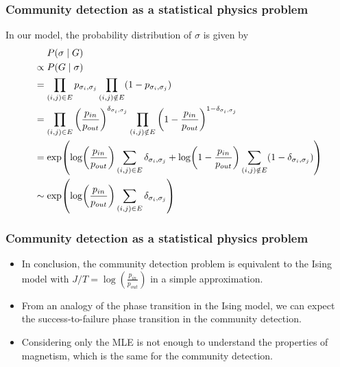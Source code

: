 \documentclass[dvipdfmx,11pt]{beamer}
\begin{document}
\begin{frame}
  \frametitle{Community detection as a statistical physics problem}
  In our model, the probability distribution of $\sigma$ is given by
  \begin{align*}
    & ~~~~ P(\sigma \mid G) \\
    &\propto P(G \mid \sigma) \\
    & = \prod_{(i, j) \in E}  p_{\sigma_i, \sigma_j} \prod_{(i, j) \notin E} (1 - p_{\sigma_i, \sigma_j}) \\
    & = \prod_{(i,j) \in E} \qty(\frac{p_{in}}{p_{out}})^{\delta_{\sigma_i, \sigma_j}} \prod_{(i, j) \notin E}   \qty(1 - \frac{p_{in}}{p_{out}})^{1 - \delta_{\sigma_i, \sigma_j}} \\
    & = \exp(\log(\frac{p_{in}}{p_{out}}) \sum_{(i, j) \in E}  \delta_{\sigma_i, \sigma_j} + \log(1 - \frac{p_{in}}{p_{out}}) \sum_{(i, j) \notin E}  (1 - \delta_{\sigma_i, \sigma_j})) \\
    & \sim \exp(\log(\frac{p_{in}}{p_{out}}) \sum_{(i, j) \in E}  \delta_{\sigma_i, \sigma_j} )
  \end{align*}
\end{frame}

\begin{frame}
  \frametitle{Community detection as a statistical physics problem}
  \begin{itemize}
    \item In conclusion, \alert{the community detection problem is equivalent to the Ising model} with $J/T = \log(\frac{p_{in}}{p_{out}})$ in a simple approximation.
    \item From an analogy of the phase transition in the Ising model, we can expect the \alert{success-to-failure phase transition} in the community detection.
    \item Considering only the MLE is not enough to understand the properties of magnetism, which is the same for the community detection.
  \end{itemize}
\end{frame}
\end{document}
